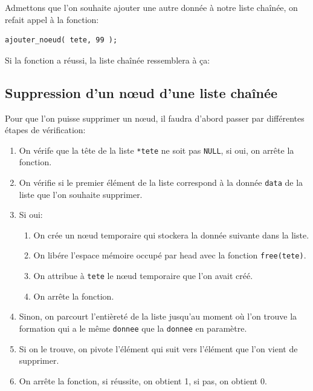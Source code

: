 \documentclass[11pt]{article}
\begin{document}
Admettons que l'on souhaite ajouter une autre donnée à notre liste chaînée, on refait appel à la fonction:
\begin{lstlisting}[firstnumber=16]
  ajouter_noeud( tete, 99 );
\end{lstlisting}

Si la fonction a réussi, la liste chaînée ressemblera à ça:

\subsection{Suppression d'un n\oe{}ud d'une liste chaînée}

Pour que l'on puisse supprimer un n\oe{}ud, il faudra d'abord passer par différentes étapes de vérification:
\begin{enumerate}
\item On vérife que la tête de la liste \texttt{*tete} ne soit pas \texttt{NULL}, si oui, on arrête la fonction.
\item On vérifie si le premier élément de la liste correspond à la donnée \texttt{data} de la liste que l'on souhaite supprimer.
\item Si oui:
  \begin{enumerate}
  \item On crée un n\oe{}ud temporaire qui stockera la donnée suivante dans la liste.
  \item On libére l'espace mémoire occupé par head avec la fonction \texttt{free(tete)}.
  \item On attribue à \texttt{tete} le n\oe{}ud temporaire que l'on avait créé.
  \item On arrête la fonction.
  \end{enumerate}
\item Sinon, on parcourt l'entièreté de la liste jusqu'au moment où l'on trouve la formation qui a le même \texttt{donnee} que la \texttt{donnee} en paramètre.
\item Si on le trouve, on pivote l'élément qui suit vers l'élément que l'on vient de supprimer.
\item On arrête la fonction, si réussite, on obtient 1, si pas, on obtient 0.
\end{enumerate}
\end{document}
